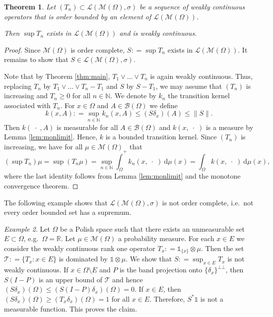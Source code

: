 \documentclass{amsart}
\numberwithin{equation}{section}
\newtheorem{thm}{Theorem}[section]
\theoremstyle{remark}
\newtheorem{example}[thm]{Example}
\theoremstyle{definition}
\begin{document}
\begin{thm}
	Let $(T_n) \subset \mathscr{L}(\mathscr{M}(\Omega),\sigma)$ be a sequence of weakly continuous operators 
	that is order bounded by an element of $\mathscr{L}(\mathscr{M}(\Omega))$.
	
	Then $\sup T_n$ exists in $\mathscr{L}(\mathscr{M}(\Omega))$ and is weakly continuous.
\end{thm}
\begin{proof}
	Since $\mathscr{M}(\Omega)$ is order complete, $S {\mathrel{\mathop:}=} \sup T_n$ exists in $\mathscr{L}(\mathscr{M}(\Omega))$.
	It remains to show that $S\in\mathscr{L}(\mathscr{M}(\Omega),\sigma)$.

	Note that by Theorem \ref{thm:main}, $T_1\vee\dots\vee T_n$ is again weakly continuous. Thus, 
	replacing $T_n$ by $T_1\vee \dots \vee T_n - T_1$ and $S$ by $S-T_1$,
	we may assume that $(T_n)$ is increasing and $T_n \geq 0$ for all $n\in{\mathds{N}}$.
	We denote by $k_n$ the transition kernel associated with $T_n$. For $x\in \Omega$ and $A\in \mathscr{B}(\Omega)$ we define
	\[ k(x,A) {\mathrel{\mathop:}=} \sup_{n\in{\mathds{N}}} k_n(x,A) \leq (S\delta_x)(A) \leq \lVert S\rVert.\]
	Then $k(\;\cdot\;,A)$ is measurable for all $A\in\mathscr{B}(\Omega)$
	and $k(x,\;\cdot\;)$ is a measure by Lemma \ref{lem:monlimit}.
	Hence, $k$ is a bounded transition kernel.
	Since $(T_n)$ is increasing, we have for all $\mu\in\mathscr{M}(\Omega)_+$ that
	\[ (\sup T_n) \mu =  \sup (T_n \mu) = \sup_{n\in{\mathds{N}}} \int_\Omega k_n(x, \; \cdot\; ){\:\mathrm{d}}\mu(x) 
	= \int_\Omega k(x,\;\cdot\;){\:\mathrm{d}}\mu(x),\]
	where the last identity follows from Lemma \ref{lem:monlimit} and the monotone convergence theorem.
\end{proof}

The following example shows that $\mathscr{L}(\mathscr{M}(\Omega),\sigma)$ is not order complete, i.e.\ 
not every order bounded set has a supremum.

\begin{example}
\label{ex:notordercomplete}
	Let $\Omega$ be a Polish space such that there exists an unmeasurable set $E\subset \Omega$, e.g.\ $\Omega={\mathds{R}}$.
	Let $\mu\in\mathscr{M}(\Omega)$ a probability measure.
	For each $x\in E$ we consider the weakly continuous rank one operator $T_x {\mathrel{\mathop:}=} \mathds{1}_{\{x\}} \otimes \mu$. 
	Then the set $\mathscr{T} {\mathrel{\mathop:}=} \{ T_x : x\in E\}$ is dominated by $\mathds{1}\otimes \mu$.
	We show that $S{\mathrel{\mathop:}=} \sup_{x\in E} T_x$ is not weakly continuous. 
	If $x \in \Omega\setminus E$ and $P$ is the band projection onto $\{\delta_x\}^{\bot\bot}$, then $S(I-P)$ is 
	an upper bound of $\mathscr{T}$ and hence $(S\delta_x)(\Omega) \leq (S(I-P)\delta_x)(\Omega)=0$.
	If $x\in E$, then $(S\delta_x)(\Omega)\geq (T_x\delta_x)(\Omega) = 1$ for all $x\in E$.
	Therefore, $S^*\mathds{1}$ is not a measurable function. This proves the claim.
\end{example}
\end{document}

